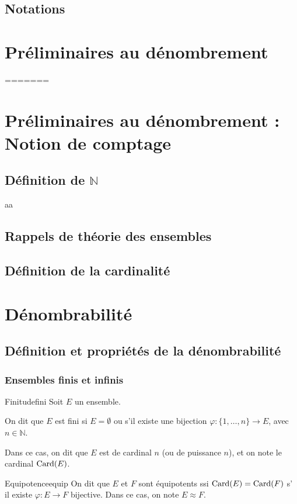 \documentclass[a4paper,french,final]{memoir}
\begin{document}
\chapter{Notations}
\mainmatter
\part{Préliminaires au dénombrement}
=======
\part{Préliminaires au dénombrement : Notion de comptage}
\chapter{\texorpdfstring{Définition de $\mathbb{N}$}{Définition de N}}
aa
\chapter{Rappels de théorie des ensembles}

\chapter{Définition de la cardinalité}
\part{Dénombrabilité}
\chapter{Définition et propriétés de la dénombrabilité}

\section{Ensembles finis et infinis}

\begin{defb}{Finitude}{fini}
     Soit $E$ un ensemble. 
	    
	On dit que $E$ est fini si $E = \emptyset$ ou s'il existe une bijection $\varphi : \{1,\dots,n \} \to E$, avec $n \in \mathbb{N}$. 
		
	Dans ce cas, on dit que $E$ est de cardinal $n$ (ou de puissance $n$), et on note le cardinal $\operatorname{Card}(E)$. 
\end{defb}

\begin{defb}{Equipotence}{equip}
    On dit que $E$ et $F$ sont équipotents ssi $\operatorname{Card}(E) = \operatorname{Card}(F)$ s' il existe $\varphi : E \to F$ bijective. Dans ce cas, on note $E \mathrel{\approx} F$. 
\end{defb}
\end{document}
